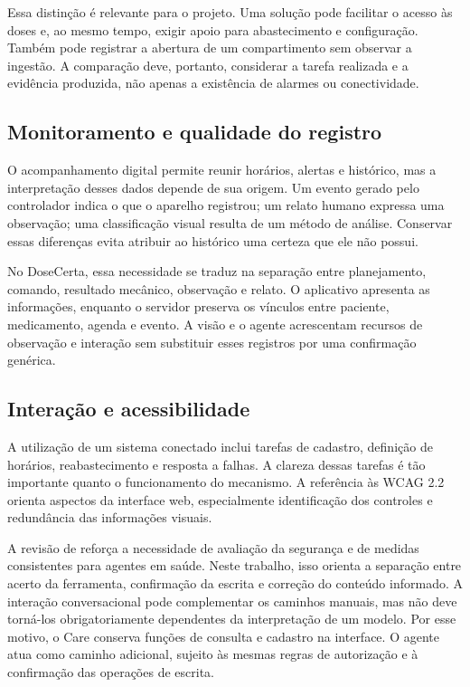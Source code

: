 Essa distinção é relevante para o projeto. Uma solução pode facilitar o acesso às doses e, ao mesmo tempo, exigir apoio para abastecimento e configuração. Também pode registrar a abertura de um compartimento sem observar a ingestão. A comparação deve, portanto, considerar a tarefa realizada e a evidência produzida, não apenas a existência de alarmes ou conectividade.

\subsection{Monitoramento e qualidade do registro}
O acompanhamento digital permite reunir horários, alertas e histórico, mas a interpretação desses dados depende de sua origem. Um evento gerado pelo controlador indica o que o aparelho registrou; um relato humano expressa uma observação; uma classificação visual resulta de um método de análise. Conservar essas diferenças evita atribuir ao histórico uma certeza que ele não possui.

No DoseCerta, essa necessidade se traduz na separação entre planejamento, comando, resultado mecânico, observação e relato. O aplicativo apresenta as informações, enquanto o servidor preserva os vínculos entre paciente, medicamento, agenda e evento. A visão e o agente acrescentam recursos de observação e interação sem substituir esses registros por uma confirmação genérica.

\subsection{Interação e acessibilidade}
A utilização de um sistema conectado inclui tarefas de cadastro, definição de horários, reabastecimento e resposta a falhas. A clareza dessas tarefas é tão importante quanto o funcionamento do mecanismo. A referência às WCAG 2.2 orienta aspectos da interface web, especialmente identificação dos controles e redundância das informações visuais. \cite{WCAG22}

A revisão de  reforça a necessidade de avaliação da segurança e de medidas consistentes para agentes em saúde. Neste trabalho, isso orienta a separação entre acerto da ferramenta, confirmação da escrita e correção do conteúdo informado. A interação conversacional pode complementar os caminhos manuais, mas não deve torná-los obrigatoriamente dependentes da interpretação de um modelo. Por esse motivo, o Care conserva funções de consulta e cadastro na interface. O agente atua como caminho adicional, sujeito às mesmas regras de autorização e à confirmação das operações de escrita.

